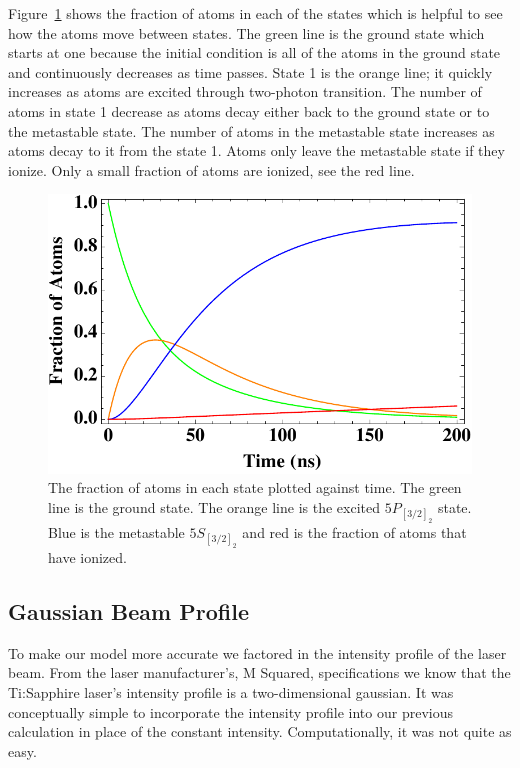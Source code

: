 \documentclass[prb,preprint]{revtex4-1}
\begin{document}
Figure~\ref{TimeGraph} shows the fraction of atoms in each of the states which is helpful to see how the atoms move between states. The green line is the ground state which starts at one because the initial condition is all of the atoms in the ground state and continuously decreases as time passes. State 1 is the orange line; it quickly increases as atoms are excited through two-photon transition. The number of atoms in state 1 decrease as atoms decay either back to the ground state or to the metastable state. The number of atoms in the metastable state increases as atoms decay to it from the state 1. Atoms only leave the metastable state if they ionize. Only a small fraction of atoms are ionized, see the red line.

\begin{figure}[h!]
\centering
\includegraphics[width=6in]{TimeGraph.pdf}
\caption{The fraction of atoms in each state plotted against time. The green line is the ground state. The orange line is the excited $5P_{[3/2]_2}$ state. Blue is the metastable $5S_{[3/2]_2}$ and red is the fraction of atoms that have ionized.}
\label{TimeGraph}
\end{figure}

\subsection{Gaussian Beam Profile}

To make our model more accurate we factored in the intensity profile of the laser beam. From the laser manufacturer's, M Squared, specifications we know that the Ti:Sapphire laser's intensity profile is a two-dimensional gaussian. It was conceptually simple to incorporate the intensity profile into our previous calculation in place of the constant intensity. Computationally, it was not quite as easy.
\end{document}
